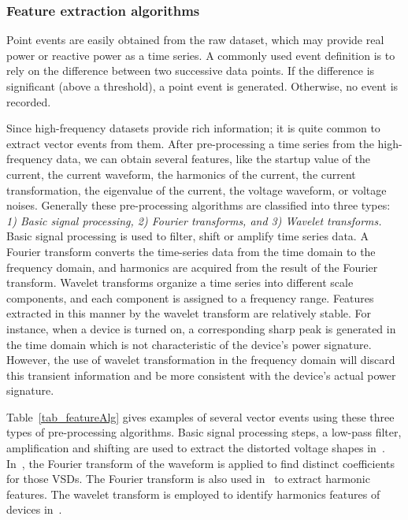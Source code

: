 \subsubsection{Feature extraction algorithms}
Point events are easily obtained from the raw dataset, which may provide real power or reactive power as a time series. 
A commonly used event definition is to rely
on the difference between two successive data points.
If the difference is significant (above a threshold), a point event is generated. Otherwise, no event is recorded. 

Since high-frequency datasets provide rich information; it is quite common to extract vector events from them. 
After pre-processing a time series from the high-frequency data, 
we can obtain several features, like the startup value of the current, the current waveform, the harmonics of the current, 
the current transformation, the eigenvalue of the current, 
the voltage waveform, or voltage noises. 
Generally these pre-processing algorithms are classified into 
three types: 
{\em 1) Basic signal processing, 2) Fourier transforms, and 3) 
Wavelet transforms.}
Basic signal processing is used to filter, shift or amplify time series data. 
A Fourier transform converts the time-series data 
from the time domain to the frequency domain, and  
harmonics are acquired from the result of the Fourier transform.  
Wavelet transforms organize a time series into different 
scale components, and each component is assigned to a frequency range. 
Features extracted in this manner
by the wavelet transform are relatively stable.  
For instance, when a device is turned on, a corresponding sharp peak is generated 
in the time domain which is not characteristic of the device's power signature. 
However, the use of wavelet transformation in the frequency domain will discard this transient information and be more consistent with the device's actual power signature.


Table~\ref{tab_featureAlg} gives examples of several vector events using these 
three types of pre-processing algorithms.
Basic signal processing steps, a low-pass filter, amplification and shifting 
are used to extract the distorted voltage shapes in~\cite{cox2006transient}.
In~\cite{wichakool2009modeling}, the Fourier transform of the waveform is applied to 
find distinct coefficients for those VSDs. 
The Fourier transform is also used in~\cite{jin2011robust} to extract 
harmonic features. 
The wavelet transform is employed to identify harmonics features of devices 
in~\cite{chan2000harmonics}. 

